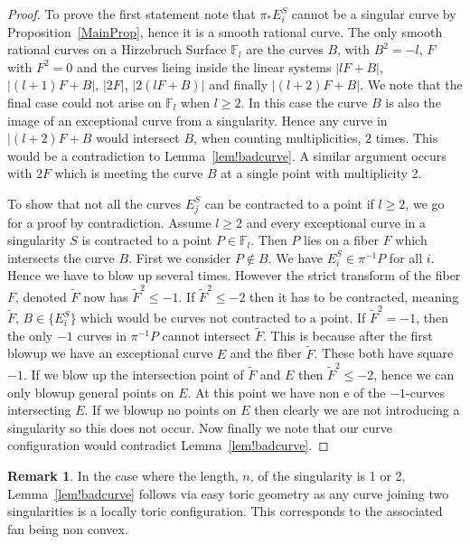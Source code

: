 \documentclass[11pt]{amsbook}
\theoremstyle{definition}
\theoremstyle{definition}
\theoremstyle{definition}
\theoremstyle{definition}
\theoremstyle{definition}
\theoremstyle{definition}
\theoremstyle{definition}
\theoremstyle{definition}
\newtheorem*{rem}{Remark}
\newcommand{\mb}[1]{\mathbb{#1}}
\newcommand{\wt}[1]{\widetilde #1}
\begin{document}
\begin{proof}
To prove the first statement note that $\pi_* E_i^S$ cannot be a singular curve by Proposition~\ref{MainProp}, hence it is a smooth rational curve. The only smooth rational curves on a Hirzebruch Surface $\mb{F}_l$ are the curves $B$, with $B^2 = -l$, $F$ with $F^2 = 0$ and the curves lieing inside the linear systems $|lF + B|$,  $|(l+1)F + B|$, $|2F|$, $|2(lF+B)|$  and finally $|(l+2)F + B|$. We note that the final case could not arise on $\mb{F}_l$ when $l \ge 2$.  In this case the curve $B$ is also the image of an exceptional curve from a singularity. Hence any curve in $|(l+2)F + B$ would intersect $B$, when counting multiplicities, $2$ times. This would be a contradiction to Lemma~\ref{lem!badcurve}. A similar argument occurs with $2F$ which is meeting the curve $B$ at a single point with multiplicity 2.



To show that not all the curves $E_j^S$ can be contracted to a point if $l \geq 2$, we go for a proof by contradiction. Assume $l \ge 2$ and every exceptional curve in a singularity $S$ is contracted to a point $P \in \mb{F}_l$. Then $P$ lies on a fiber $F$ which intersects the curve $B$. First we consider $P \not\in B$. We have $E_i^S \in \pi^{-1}{P}$ for all $i$. Hence we have to blow up several times. However the strict transform of the fiber $F$, denoted $\wt{F}$ now has $\wt{F}^2 \leq -1$. If $\wt{F}^2 \leq -2$ then it has to be contracted, meaning $\wt{F}, \, B \in \{ E_i^S \}$ which would be curves not contracted to a point. If $\wt{F}^2 = -1$, then the only $-1 $ curves in $\pi^{-1}{P}$ cannot intersect $\wt{F}$. This is because after the first blowup we have an exceptional curve $E$ and the fiber $\wt{F}$. These both have square $-1$. If we blow up the intersection point of $\wt{F}$ and $E$ then $\wt{F}^2 \leq -2$, hence we can only blowup general points on $E$. At this point we have non e of the $-1$-curves intersecting $E$. If we blowup no points on $E$ then clearly we are not introducing a singularity so this does not occur. Now finally we note that our curve configuration would contradict Lemma~\ref{lem!badcurve}. 

\end{proof}

\begin{rem}
In the case where the length, $n$, of the singularity is 1 or 2, Lemma~\ref{lem!badcurve} follows via easy toric geometry as any curve joining two singularities is a locally toric configuration. This corresponds to the associated fan being non convex. 
\end{rem}
\end{document}

